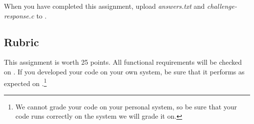 When you have completed this assignment, upload \textit{answers.txt} and \textit{challenge-response.c} to \filesubmission.

\policyforcodethatdoesnotcompile

\pointerlablatepolicy

\subsection*{Rubric}

This assignment is worth 25 points.
All functional requirements will be checked on \runtimeenvironment.
If you developed your code on your own system, be sure that it performs as expected on \runtimeenvironment.\footnote{
    We cannot grade your code on your personal system, so be sure that your code runs correctly on the system we will grade it on.
}
